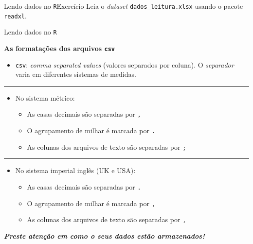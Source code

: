 \documentclass[
  10pt,
  ignorenonframetext,
]{beamer}
\providecommand{\tightlist}{%
  \setlength{\itemsep}{0pt}\setlength{\parskip}{0pt}}\usepackage{longtable,booktabs,array}
\newcommand*{\regrafina}{\rule{\textwidth}{0.5pt}}
\begin{document}
\begin{frame}[fragile]{Lendo dados no \texttt{R}\newline Exercício}
\protect\hypertarget{lendo-dados-no-rexercuxedcio}{}
Leia o \emph{dataset} \texttt{dados\_leitura.xlsx} usando o pacote
\texttt{readxl}.
\end{frame}

\begin{frame}[fragile]{Lendo dados no \texttt{R}}
\protect\hypertarget{lendo-dados-no-r-2}{}
\small

\textbf{As formatações dos arquivos \texttt{csv}}

\begin{itemize}
\tightlist
\item
  \texttt{csv}: \emph{comma separated values} (valores separados por
  coluna). O \emph{separador} varia em diferentes sistemas de medidas.
\end{itemize}

\regrafina

\begin{itemize}
\tightlist
\item
  No sistema métrico:

  \begin{itemize}
  \tightlist
  \item
    As casas decimais são separadas por \texttt{,}
  \item
    O agrupamento de milhar é marcada por \texttt{.}
  \item
    As colunas dos arquivos de texto são separadas por \texttt{;}
  \end{itemize}
\end{itemize}

\regrafina

\begin{itemize}
\tightlist
\item
  No sistema imperial inglês (UK e USA):

  \begin{itemize}
  \tightlist
  \item
    As casas decimais são separadas por \texttt{.}
  \item
    O agrupamento de milhar é marcada por \texttt{,}
  \item
    As colunas dos arquivos de texto são separadas por \texttt{,}
  \end{itemize}
\end{itemize}

\textbf{\emph{Preste atenção em como o seus dados estão armazenados!}}

\normalsize
\end{frame}
\end{document}
